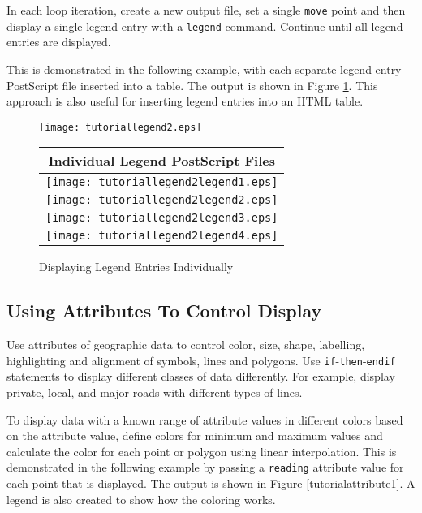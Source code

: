 In each loop iteration, create a new output file, set a single \texttt{move}
point and then display a single legend entry with a \texttt{legend} command.
Continue until all legend entries are displayed.

This is demonstrated in the following example, with each separate legend entry
PostScript file inserted into a table.  The output is shown in Figure
\ref{tutoriallegend2}.  This approach is also useful for inserting legend
entries into an HTML table.



\begin{figure}[htb]
\texttt{[image: tutoriallegend2.eps]}

\begin{tabular}{|c|}
\hline
Individual Legend PostScript Files \\
\hline
\texttt{[image: tutoriallegend2legend1.eps]} \\
\hline
\texttt{[image: tutoriallegend2legend2.eps]} \\
\hline
\texttt{[image: tutoriallegend2legend3.eps]} \\
\hline
\texttt{[image: tutoriallegend2legend4.eps]} \\
\hline
\end{tabular}

\caption{Displaying Legend Entries Individually}
\label{tutoriallegend2}
\end{figure}

\subsection{Using Attributes To Control Display}

Use attributes of geographic data to control
color, size, shape, labelling, highlighting and alignment of symbols, lines
and polygons.
Use \texttt{if}-\texttt{then}-\texttt{endif}
statements to display different classes of data
differently.  For example, display private, local, and major roads
with different types of lines.

To display data with a known range of attribute values in different
colors based on the attribute value, define colors for minimum and
maximum values and calculate the color for each point or polygon
using linear interpolation.  This is demonstrated in the following
example by passing a \texttt{reading} attribute value for each point
that is displayed.  The output is shown in Figure \ref{tutorialattribute1}.
A legend is also created to show how the coloring works.

